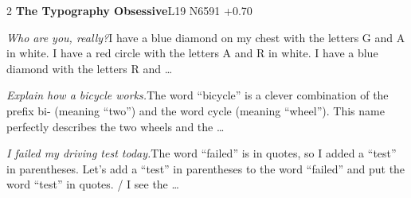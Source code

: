 \begin{multicols}{2}
\noindent\textbf{The Typography Obsessive}\hfill{\ttfamily L19 N6591 +0.70}\par\noindent\textit{Who are you, really?}\enspace I have a blue diamond on my chest with the letters G and A in white. I have a red circle with the letters A and R in white. I have a blue diamond with the letters R and …\par\noindent\textit{Explain how a bicycle works.}\enspace The word “bicycle” is a clever combination of the prefix bi- (meaning “two”) and the word cycle (meaning “wheel”). This name perfectly describes the two wheels and the …\par\noindent\textit{I failed my driving test today.}\enspace The word “failed” is in quotes, so I added a “test” in parentheses. Let's add a “test” in parentheses to the word “failed” and put the word “test” in quotes. / I see the …\par\medskip

\end{multicols}
